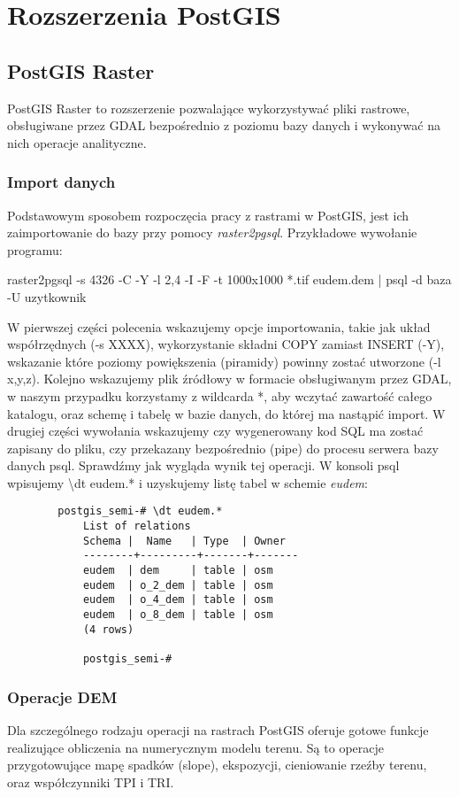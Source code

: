 	
\chapter{Rozszerzenia PostGIS}
	\section{PostGIS Raster}
 PostGIS Raster to rozszerzenie pozwalające wykorzystywać pliki rastrowe, obsługiwane przez GDAL bezpośrednio z poziomu bazy danych i wykonywać na nich operacje analityczne.
	 \subsection{Import danych}
Podstawowym sposobem rozpoczęcia pracy z rastrami w PostGIS, jest ich zaimportowanie do bazy przy pomocy \textit{raster2pgsql}. Przykładowe wywołanie programu:
\begin{center}
\colorbox{code-gray}{raster2pgsql -s 4326 -C -Y -l 2,4 -I -F -t 1000x1000 *.tif eudem.dem | psql -d baza -U uzytkownik}
\end{center}
	W pierwszej części polecenia wskazujemy opcje importowania, takie jak układ współrzędnych (-s XXXX), wykorzystanie składni COPY zamiast INSERT (-Y), wskazanie które poziomy powiększenia (piramidy) powinny zostać utworzone (-l x,y,z). Kolejno wskazujemy plik źródłowy w formacie obsługiwanym przez GDAL, w naszym przypadku korzystamy z wildcarda *, aby wczytać zawartość całego katalogu, oraz schemę i tabelę w bazie danych, do której ma nastąpić import. W drugiej części wywołania wskazujemy czy wygenerowany kod SQL ma zostać zapisany do pliku, czy przekazany bezpośrednio (pipe) do procesu serwera bazy danych psql.
	Sprawdźmy jak wygląda wynik tej operacji. W konsoli psql wpisujemy \colorbox{code-gray}{\textbackslash dt eudem.*} i uzyskujemy listę tabel w schemie \textit{eudem}:
	\begin{lstlisting}
		postgis_semi-# \dt eudem.*
			List of relations
			Schema |  Name   | Type  | Owner 
			--------+---------+-------+-------
			eudem  | dem     | table | osm
			eudem  | o_2_dem | table | osm
			eudem  | o_4_dem | table | osm
			eudem  | o_8_dem | table | osm
			(4 rows)
			
			postgis_semi-# 
	\end{lstlisting}
	
	\subsection{Operacje DEM}
	Dla szczególnego rodzaju operacji na rastrach PostGIS oferuje gotowe funkcje realizujące obliczenia na numerycznym modelu terenu. Są to operacje przygotowujące mapę spadków (slope), ekspozycji, cieniowanie rzeźby terenu, oraz współczynniki TPI i TRI. 
	

